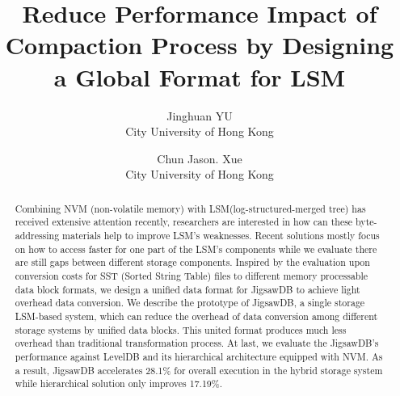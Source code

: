 \usepackage{filecontents}




\date{}

\title{\Large \bf Reduce Performance Impact of Compaction Process by Designing a Global Format for LSM}

\author{
{\rm Jinghuan YU}\\
City University of Hong Kong
\and
{\rm Chun Jason. Xue}\\
City University of Hong Kong
} %

\maketitle

\begin{abstract}
Combining NVM (non-volatile memory) with LSM(log-structured-merged tree) has received extensive attention recently, researchers are interested in how can these byte-addressing materials help to improve LSM's weaknesses. Recent solutions mostly focus on how to access faster for one part of the LSM's components while we evaluate there are still gaps between different storage components. Inspired by the evaluation upon conversion costs for SST (Sorted String Table) files to different memory processable data block formats, we design a unified data format for JigsawDB to achieve light overhead data conversion. We describe the prototype of JigsawDB, a single storage LSM-based system, which can reduce the overhead of data conversion among different storage systems by unified data blocks. This united format produces much less overhead than traditional transformation process. At last, we evaluate the JigsawDB's performance against LevelDB and its hierarchical architecture equipped with NVM. As a result, JigsawDB accelerates 28.1\% for overall execution in the hybrid storage system while hierarchical solution only improves 17.19\%.
\end{abstract}


